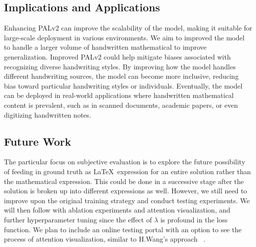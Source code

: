 \documentclass[9pt,a4paper,twoside]{rho-class/rho}
\begin{document}
\subsection{Implications and Applications}
Enhancing PALv2 can improve the scalability of the model, making it suitable for large-scale deployment in various environments. We aim to improved the model to handle a larger volume of handwritten mathematical to improve generalization. Improved PALv2 could help mitigate biases associated with recognizing diverse handwriting styles. By improving how the model handles different handwriting sources, the model can become more inclusive, reducing bias toward particular handwriting styles or individuals.
Eventually, the model can be deployed in real-world applications where handwritten mathematical content is prevalent, such as in scanned documents, academic papers, or even digitizing handwritten notes. 

\subsection{Future Work}
The particular focus on subjective evaluation is to explore the future possibility of feeding in ground truth as \LaTeX\ expression for an entire solution rather than the mathematical expression. This could be done in a successive stage after the solution is broken up into different expressions as well. 
However, we still need to improve upon the original training strategy and conduct testing experiments. We will then follow with ablation experiments and attention visualization, and further hyperparameter tuning since the effect of $\lambda$ is profound in the loss function. We plan to include an online testing portal with an option to see the process of attention visualization, similar to H.Wang's approach ~\cite{hwang}. 

\printbibliography

\end{document}
